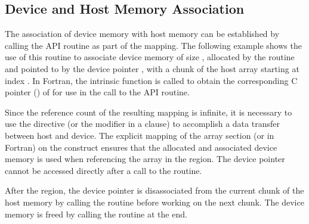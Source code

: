 \subsection{Device and Host Memory Association}
\label{subsec:target_associate_ptr}
\label{sec:target_associate_ptr}

The association of device memory with host memory
can be established by calling the  
API routine as part of the mapping.
The following example shows the use of this routine
to associate device memory of size , 
allocated by the  routine and
pointed to by the device pointer , 
with a chunk of the host array  starting at index .
In Fortran, the intrinsic function  is called
to obtain the corresponding C pointer () of  
for use in the call to the API routine.

Since the reference count of the resulting mapping is infinite,
it is necessary to use the  directive (or
the  modifier in a  clause) to accomplish a
data transfer between host and device.
The explicit mapping of the array section  
(or  in Fortran) on the 
construct ensures that the allocated and associated device memory is used 
when referencing the array  in the  region.
The device pointer  cannot be accessed directly 
after a call to the  routine.

After the  region, the device pointer is disassociated from
the current chunk of the host memory by calling the  routine before working on the next chunk.
The device memory is freed by calling the 
routine at the end.



